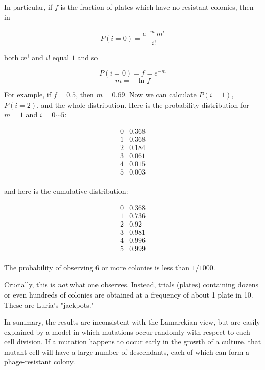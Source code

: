 \documentclass[11pt, oneside]{article}
\begin{document}
In particular, if $f$ is the fraction of plates which have no resistant colonies, then in

\[ P(i=0) = \frac{e^{-m} \ m^i }{ i! } \]

both $m^i$ and $i!$ equal $1$ and so

\[ P(i=0) = f = e^{-m} \]
\[ m = - \ln f \]

For example, if $f=0.5$, then $m=0.69$.  Now we can calculate $P(i=1)$, $P(i=2)$, and the whole distribution.  Here is the probability distribution for $m=1$ and $i=0 \cdots 5$:

\[
\begin{matrix}
0 & 0.368 \\
1 & 0.368 \\
2 & 0.184 \\
3 & 0.061 \\
4 & 0.015 \\
5 & 0.003 \\
\end{matrix}
\]

and here is the cumulative distribution:

\[
\begin{matrix}
0 & 0.368 \\
1 & 0.736 \\
2 & 0.92 \\
3 & 0.981 \\
4 & 0.996 \\
5 & 0.999 \\
\end{matrix}
\]

The probability of observing 6 or more colonies is less than $1/1000$.

Crucially, this is \emph{not} what one observes.  Instead, trials (plates) containing dozens or even hundreds of colonies are obtained at a frequency of about 1 plate in 10.  These are Luria's "jackpots."

In summary, the results are inconsistent with the Lamarckian view, but are easily explained by a model in which mutations occur randomly with respect to each cell division.  If a mutation happens to occur early in the growth of a culture, that mutant cell will have a large number of descendants, each of which can form a phage-resistant colony.
\end{document}
